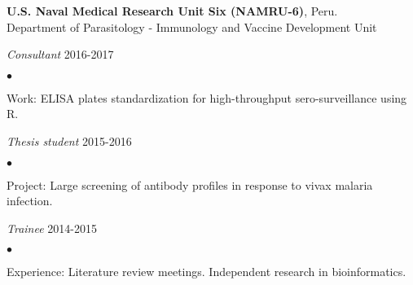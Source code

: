 \documentclass[margin,line]{res}
\newenvironment{list1}{
  \begin{list}{\ding{113}}{%
      \setlength{\itemsep}{0in}
      \setlength{\parsep}{0in} \setlength{\parskip}{0in}
      \setlength{\topsep}{0in} \setlength{\partopsep}{0in}
      \setlength{\leftmargin}{0.17in}}}{\end{list}}
\newenvironment{list2}{
  \begin{list}{$\bullet$}{%
      \setlength{\itemsep}{0in}
      \setlength{\parsep}{0in} \setlength{\parskip}{0in}
      \setlength{\topsep}{0in} \setlength{\partopsep}{0in}
      \setlength{\leftmargin}{0.2in}}}{\end{list}}
\begin{document}
\begin{resume}
{\bf U.S. Naval Medical Research Unit Six (NAMRU-6)}, Peru.\\
Department of Parasitology - Immunology and Vaccine Development Unit\\
\vspace*{-.1in}
\begin{list1}
	\item[] {\em Consultant} \hfill 2016-2017\\%
	\vspace*{-.1in}
	\begin{list2} %
		\item Work: ELISA plates standardization for high-throughput sero-surveillance using R.\\%
	\end{list2}
	\vspace*{-.1in}
	\item[] {\em Thesis student} \hfill 2015-2016\\%
	\vspace*{-.1in}
	\begin{list2} %
		\item Project: Large screening of antibody profiles in response to vivax malaria infection.\\
	\end{list2}
	\vspace*{-.1in}
	\item[] {\em Trainee} \hfill 2014-2015\\%
	\vspace*{-.1in}
	\begin{list2} %
		\item Experience: Literature review meetings. Independent research in bioinformatics.%

\end{list2}
\end{list1}
\end{resume}
\end{document}
